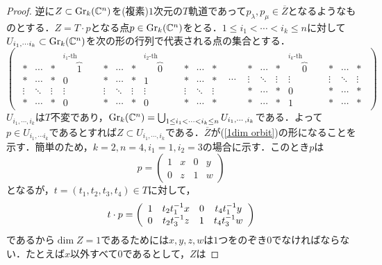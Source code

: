 \begin{proof}
  逆に$Z\subset\text{Gr}_k(\mathbb{C}^n)$を(複素)$1$次元の$T$軌道であって$p_\lambda,p_\mu\in\overline{Z}$となるようなものとする．$Z=T\cdot p$となる点$p\in\text{Gr}_k(\mathbb{C}^n)$をとる．$1\leq i_1<\cdots <i_k\leq n$に対して$U_{i_1,\cdots i_k}\subset\text{Gr}_k(\mathbb{C}^n)$を次の形の行列で代表される点の集合とする．
  \begin{equation}\label{chart of grassmannian}
    \left(\begin{array}{ccc}
      {\begin{array}{ccccccccccc}
      * & \cdots & * & \overbrace{1}^{i_1\text{-th column}} & * & \cdots & * & \overbrace{0}^{i_{2}\text{-th column}} & * & \cdots & *\\
      * & \cdots & * & 0 & * & \cdots & * & 1 & * & \cdots & *\\
      \vdots & \ddots & \vdots & \vdots & \vdots & \ddots & \vdots & \vdots & \vdots & \ddots & \vdots\\
      * & \cdots & * & 0 & * & \cdots & * & 0 & * & \cdots & * 
      \end{array}} & \cdots & 
      {\begin{array}{ccccccc}
      * & \cdots & * & \overbrace{0}^{i_{k}\text{-th column}} & * &\cdots & *\\
      \vdots & \ddots & \vdots & \vdots & \vdots & \ddots & \vdots\\
      * & \cdots & * & 0 & * & \cdots & *\\
      * & \cdots & * & 1 & * & \cdots & *
      \end{array}}
    \end{array}\right)
  \end{equation}
  $U_{i_1,\cdots,i_k}$は$T$不変であり，$\text{Gr}_k(\mathbb{C}^n)=\bigcup_{1\leq i_1<\cdots<i_k\leq n}U_{i_1,\cdots,i_k}$である．よって$p\in U_{i_1,\cdots i_k}$であるとすれば$Z\subset U_{i_1,\cdots,i_k}$である．$\overline{Z}$が(\ref{1dim orbit})の形になることを示す．簡単のため，$k=2,n=4,i_1=1,i_2=3$の場合に示す．このとき$p$は
  \[
  p=\left(\begin{array}{cccc}
    1 & x & 0 & y \\
    0 & z & 1 & w
  \end{array}\right)
  \]
  となるが，$t=(t_1,t_2,t_3,t_4)\in T$に対して，
  \[
  t\cdot p = \left(\begin{array}{cccc}
    1 & t_2t_1^{-1}x & 0 & t_4t_1^{-1}y \\
    0 & t_2t_3^{-1}z & 1 & t_4t_3^{-1}w 
  \end{array}\right)
  \]
  であるから$\dim Z=1$であるためには$x,y,z,w$は$1$つをのぞき$0$でなければならない．たとえば$x$以外すべて$0$であるとして，$Z$は

\end{proof}
